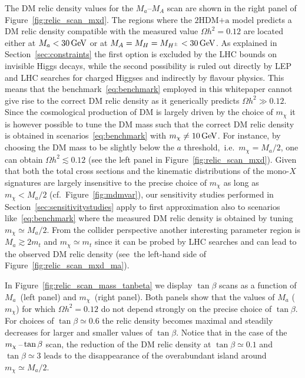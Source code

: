\documentclass[a4paper, 11pt,notoc]{article}
\newcommand{\mA}{\ensuremath{M_{A}}\xspace}
\newcommand{\ma}{\ensuremath{M_{a}}\xspace}
\newcommand{\mH}{\ensuremath{M_{H}}\xspace}
\newcommand{\mHc}{\ensuremath{M_{H^{\pm}}}\xspace}
\newcommand{\hdma}{\ensuremath{\textrm{2HDM+a}}\xspace}
\begin{document}
 The DM relic density values for the $\ma$--$\mA$ scan  are shown in the right panel of Figure~\ref{fig:relic_scan_mxd}. The regions where the \hdma model predicts a DM relic density compatible with the measured value $\Omega h^{2} = 0.12$ are located either at $\ma < 30 \, {\rm GeV}$ or at $\mA=\mH=\mHc < 30 \, {\rm GeV}$. As explained in Section~\ref{sec:constraints} the first option is excluded by the LHC bounds on invisible Higgs decays, while the second possibility is ruled out directly by LEP and LHC searches for charged Higgses and indirectly by flavour physics. This means that the benchmark~\eqref{eq:benchmark} employed in this whitepaper cannot give rise to the correct DM relic density as it generically predicts $\Omega h^{2} \gg 0.12$.  Since the cosmological production of DM is largely driven by the choice of $m_\chi$ it is however possible to tune the DM mass such that the correct DM relic density is obtained in scenarios~\eqref{eq:benchmark} with $m_\chi \neq 10 \, {\rm GeV}$.  For instance, by choosing the DM mass to be slightly below the $a$ threshold,~i.e.~$m_\chi = \ma/2$, one can obtain $\Omega h^{2} \lesssim 0.12$ (see the left panel in Figure~\ref{fig:relic_scan_mxd}). Given that both the total cross sections and the kinematic distributions of the mono-$X$ signatures are largely insensitive to the precise choice of $m_\chi$ as long as $m_\chi < \ma/2$ (cf.~Figure~\ref{fig:mdmvar}), our sensitivity studies performed in Section~\ref{sec:sensitivitystudies} apply to first approximation also to scenarios like~\eqref{eq:benchmark} where the measured DM relic density is obtained by tuning $ m_\chi \simeq \ma/2$. From the collider perspective another interesting parameter region is $M_a \gtrsim  2 m_t$ and $m_\chi \simeq m_t$ since it can be probed by LHC searches and can lead to the observed DM relic density (see~the left-hand side of Figure~\ref{fig:relic_scan_mxd_ma}).  

 In Figure~\ref{fig:relic_scan_mass_tanbeta} we display $\tan \beta$ scans as a function of $\ma$~(left panel) and $m_\chi$~(right panel). Both panels show that the values of $\ma$ ($m_\chi$) for which $\Omega h^{2} = 0.12$ do not depend strongly on the precise choice of $\tan \beta$. For choices of $\tan \beta \simeq 0.6$ the relic density becomes maximal and steadily decreases for larger and smaller values of $\tan \beta$. Notice that in the case of the $m_\chi \hspace{0.5mm}$--$\hspace{0.5mm} \tan \beta$ scan, the reduction of the DM relic density at $\tan \beta \simeq 0.1$ and $\tan \beta \simeq 3$  leads to the disappearance of the overabundant island around $m_\chi\simeq\ma/2$.
 
\end{document}
